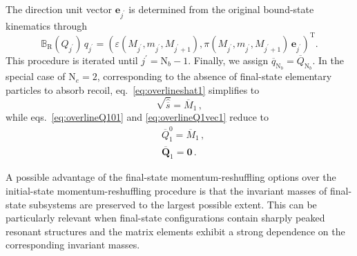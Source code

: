 The direction unit vector ${\bm e}_{j^\prime}$ is determined from the original bound-state kinematics through
\begin{equation}
    \mathds{B}_\mathrm{R}(Q_{j^\prime})\,q_{j^\prime} = \left(\varepsilon(M_{j^\prime},m_{j^\prime},M_{j^\prime+1}),\pi(M_{j^\prime},m_{j^\prime},M_{j^\prime+1})\,{\bm e}_{j^\prime}\right)^\mathrm{T}.
\end{equation}
This procedure is iterated until $j^\prime=\mathrm{N}_b-1$. Finally, we assign $\overline{q}_{\mathrm{N}_b}=\overline{Q}_{\mathrm{N}_b}$. In the special case of $\mathrm{N}_e=2$, corresponding to the absence of final-state elementary particles to absorb recoil, eq.~\eqref{eq:overlineshat1} simplifies to
\begin{equation}
    \sqrt{\hat{\overline{s}}} = \overline{M}_1\,,
\label{eq:overlineshat2}
\end{equation}
while eqs.~\eqref{eq:overlineQ101} and \eqref{eq:overlineQ1vec1} reduce to
\begin{align}
    &\overline{Q}_{1}^0 = \overline{M}_{1}\,,\label{eq:overlineQ102}\\
    &\overline{\bm Q}_{1} ={\bm 0}\,.\label{eq:overlineQ1vec2}
\end{align}

A possible advantage of the final-state momentum-reshuffling options over the initial-state momentum-reshuffling procedure is that the invariant masses of final-state subsystems are preserved to the largest possible extent. This can be particularly relevant when final-state configurations contain sharply peaked resonant structures and the matrix elements exhibit a strong dependence on the corresponding invariant masses.
